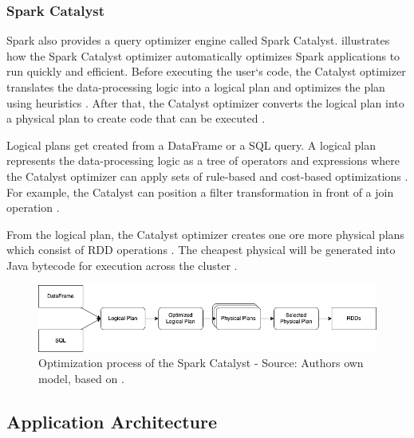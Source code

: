 \subsubsection{Spark Catalyst}
\label{subsubsec:04_spark_pr-model_catalyst}
Spark also provides a query optimizer engine called Spark Catalyst.  illustrates how the Spark Catalyst optimizer automatically optimizes Spark applications to run quickly and efficient.
Before executing the user`s code, the Catalyst optimizer translates the data-processing logic into a logical plan and optimizes the plan using heuristics \cite{Hien2018Spark}. After that, the Catalyst optimizer converts the logical plan into a physical plan to create code that can be executed \cite{Hien2018Spark}.


Logical plans get created from a DataFrame or a SQL query. A logical plan represents the data-processing logic as a tree of operators and expressions where the Catalyst optimizer can apply sets of rule-based and cost-based optimizations \cite{Hien2018Spark}.
For example, the Catalyst can position a filter transformation in front of a join operation \cite{Hien2018Spark}.

From the logical plan, the Catalyst optimizer creates one ore more physical plans which consist of RDD operations \cite{Chambers2018Spark}. The cheapest physical will be generated into Java bytecode for execution across the cluster \cite{Hien2018Spark}.

\begin{figure}[h]
\centering
\includegraphics[scale=0.5]{images/04_technical_background/spark_catalyst}
\caption{Optimization process of the Spark Catalyst - Source: Authors own model, based on \cite{Hien2018Spark}.}
\label{fig:04_spark_pr-model_catalyst_process}
\end{figure}


\subsection{Application Architecture}
\label{subsec:04_spark_architecture}

